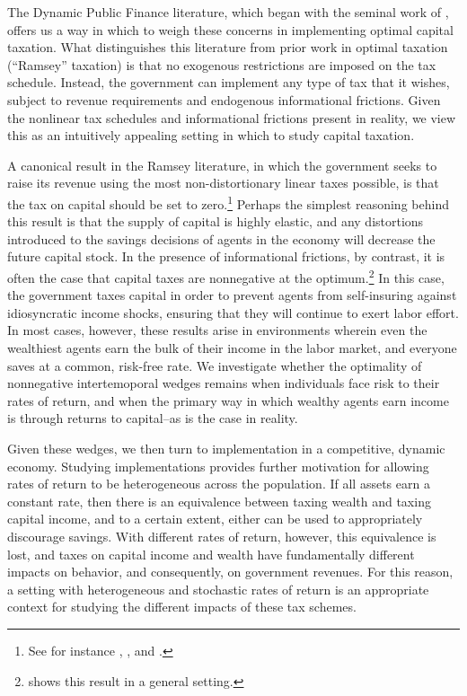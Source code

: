\documentclass[11pt]{article}
\begin{document}
The Dynamic Public Finance literature, which began with the seminal work of \cite{mirrlees1971exploration}, offers us a way in which to weigh these concerns in implementing optimal capital taxation. What distinguishes this literature from prior work in optimal taxation (``Ramsey'' taxation) is that no exogenous restrictions are imposed on the tax schedule. Instead, the government can implement any type of tax that it wishes, subject to revenue requirements and endogenous informational frictions. Given the nonlinear tax schedules and informational frictions present in reality, we view this as an intuitively appealing setting in which to study capital taxation. 

A canonical result in the Ramsey literature, in which the government seeks to raise its revenue using the most non-distortionary linear taxes possible, is that the tax on capital should be set to zero.\footnote{See for instance \cite{atkinson1976design}, \cite{chamley1986optimal}, and \cite{judd1982redistributive}.} Perhaps the simplest reasoning behind this result is that the supply of capital is highly elastic, and any distortions introduced to the savings decisions of agents in the economy will decrease the future capital stock. In the presence of informational frictions, by contrast, it is often the case that capital taxes are nonnegative at the optimum.\footnote{\cite{golosov2003optimal} shows this result in a general setting.} In this case, the government taxes capital in order to prevent agents from self-insuring against idiosyncratic income shocks, ensuring that they will continue to exert labor effort. In most cases, however, these results arise in environments wherein even the wealthiest agents earn the bulk of their income in the labor market, and everyone saves at a common, risk-free rate. We investigate whether the optimality of nonnegative intertemoporal wedges remains when individuals face risk to their rates of return, and when the primary way in which wealthy agents earn income is through returns to capital--as is the case in reality. 

Given these wedges, we then turn to implementation in a competitive, dynamic economy. Studying implementations provides further motivation for allowing rates of return to be heterogeneous across the population. If all assets earn a constant rate, then there is an equivalence between taxing wealth and taxing capital income, and to a certain extent, either can be used to appropriately discourage savings. With different rates of return, however, this equivalence is lost, and taxes on capital income and wealth have fundamentally different impacts on behavior, and consequently, on government revenues. For this reason, a setting with heterogeneous and stochastic rates of return is an appropriate context for studying the different impacts of these tax schemes. 
\end{document}
